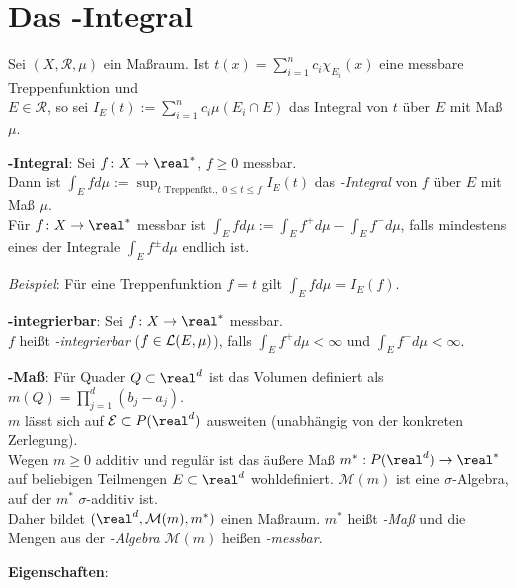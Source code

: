 \pagebreak

\section{%
    Das -Integral%
}

Sei $(X, \mathcal{R}, \mu)$ ein Maßraum.
Ist $t(x) = \sum_{i=1}^n c_i \chi_{E_i}(x)$ eine messbare Treppenfunktion
und \\
$E \in \mathcal{R}$, so sei $I_E(t) := \sum_{i=1}^n c_i \mu(E_i \cap E)$
das Integral von $t$ über $E$ mit Maß $\mu$.

\textbf{-Integral}:
Sei $f\colon X \rightarrow \real^\ast$, $f \ge 0$ messbar. \\
Dann ist
$\int_E f d\mu := \sup_{t \text{ Treppenfkt.},\; 0 \le t \le f} I_E(t)$
das \emph{-Integral} von $f$ über $E$ mit Maß $\mu$. \\
Für $f\colon X \rightarrow \real^\ast$ messbar ist
$\int_E f d\mu := \int_E f^+ d\mu - \int_E f^- d\mu$, falls mindestens eines
der Integrale $\int_E f^\pm d\mu$ endlich ist.

\emph{Beispiel}: Für eine Treppenfunktion $f = t$ gilt
$\int_E f d\mu = I_E(f)$.

\textbf{-integrierbar}:
Sei $f\colon X \rightarrow \real^\ast$ messbar. \\
$f$ heißt \emph{-integrierbar} ($f \in \mathcal{L}(E, \mu)$), falls
$\int_E f^+ d\mu < \infty$ und $\int_E f^- d\mu < \infty$.

\linie

\textbf{-Maß}:
Für Quader $Q \subset \real^d$ ist das Volumen definiert als
$m(Q) = \prod_{j=1}^d (b_j - a_j)$. \\
$m$ lässt sich auf $\mathcal{E} \subset P(\real^d)$ ausweiten
(unabhängig von der konkreten Zerlegung). \\
Wegen $m \ge 0$ additiv und regulär ist das äußere Maß
$m^\ast: P(\real^d) \rightarrow \real^\ast$ auf
beliebigen Teil\-mengen $E \subset \real^d$ wohldefiniert.
$\mathcal{M}(m)$ ist eine $\sigma$-Algebra, auf der $m^\ast$ $\sigma$-additiv
ist. \\
Daher bildet $(\real^d, \mathcal{M}(m), m^\ast)$ einen Maßraum.
$m^\ast$ heißt \emph{-Maß} und die Mengen aus
der \emph{-Algebra} $\mathcal{M}(m)$
heißen \emph{-messbar}.

\linie

\textbf{Eigenschaften}:

